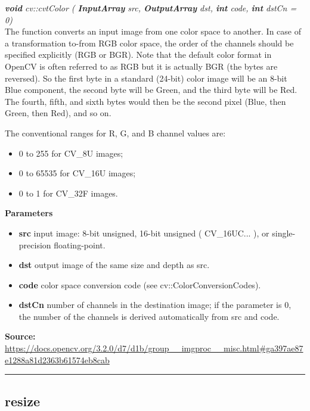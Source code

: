 \textit{\textbf{void} cv::cvtColor (
        \textbf{InputArray} src,
		\textbf{OutputArray}  	dst,
		\textbf{int}  	code,
		\textbf{int}  	dstCn = 0)}\\
		
The function converts an input image from one color space to another. In case of a transformation to-from RGB color space, the order of the channels should be specified explicitly (RGB or BGR). Note that the default color format in OpenCV is often referred to as RGB but it is actually BGR (the bytes are reversed). So the first byte in a standard (24-bit) color image will be an 8-bit Blue component, the second byte will be Green, and the third byte will be Red. The fourth, fifth, and sixth bytes would then be the second pixel (Blue, then Green, then Red), and so on.

The conventional ranges for R, G, and B channel values are:

\begin{itemize}
    \item 0 to 255 for CV\_8U images;
    \item 0 to 65535 for CV\_16U images;
    \item 0 to 1 for CV\_32F images.
\end{itemize}

\textbf{Parameters}
\begin{itemize}
    \item \textbf{src} input image: 8-bit unsigned, 16-bit unsigned ( CV\_16UC... ), or single-precision floating-point.
    \item \textbf{dst} output image of the same size and depth as src.
    \item \textbf{code} color space conversion code (see cv::ColorConversionCodes).
    \item \textbf{dstCn} number of channels in the destination image; if the parameter is 0, the number of the channels is derived automatically from src and code.
\end{itemize}

\begin{adjustbox}{width=1.2\textwidth,center=\textwidth}
\textbf{Source:} \url{https://docs.opencv.org/3.2.0/d7/d1b/group__imgproc__misc.html#ga397ae87e1288a81d2363b61574eb8cab}
\end{adjustbox}

\noindent\rule{\textwidth}{0.5pt}
		

\subsection*{resize}
\label{subsec:opencv_appendix_used_functions_resize}


